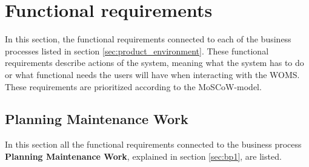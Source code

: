 \section{Functional requirements}
\label{sec:functional_requirements}

In this section, the functional requirements connected to each of the business processes listed in section \ref{sec:product_environment}. These functional requirements describe actions of the system, meaning what the system has to do or what functional needs the users will have when interacting with the WOMS. These requirements are prioritized according to the MoSCoW-model. 

\subsection{Planning Maintenance Work}
\label{sub:planning_maintenance_work}
In this section all the functional requirements connected to the business process \textbf{Planning Maintenance Work}, explained in section \ref{sec:bp1}, are listed.

